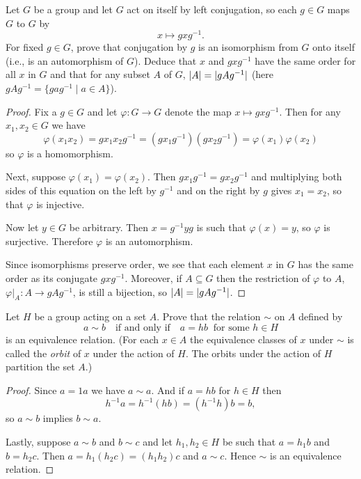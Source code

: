  Let $G$ be a group and let $G$ act on itself by left
conjugation, so each $g\in G$ maps $G$ to $G$ by
\begin{equation*}
  x\mapsto gxg^{-1}.
\end{equation*}
For fixed $g\in G$, prove that conjugation by $g$ is an isomorphism
from $G$ onto itself (i.e., is an automorphism of $G$). Deduce that
$x$ and $gxg^{-1}$ have the same order for all $x$ in $G$ and that for
any subset $A$ of $G$, $\lvert{A}\rvert = \lvert{gAg^{-1}}\rvert$ (here
$gAg^{-1} = \{gag^{-1}\mid a\in A\}$).
\label{exercise-conjugation-is-automorphism}
\begin{proof}
  Fix a $g\in G$ and let $\varphi\colon G\to G$ denote the map
  $x\mapsto gxg^{-1}$. Then for any $x_1,x_2\in G$ we have
  \begin{equation*}
    \varphi(x_1x_2) = gx_1x_2g^{-1}
    = (gx_1g^{-1})(gx_2g^{-1}) = \varphi(x_1)\varphi(x_2)
  \end{equation*}
  so $\varphi$ is a homomorphism.

  Next, suppose $\varphi(x_1) = \varphi(x_2)$. Then
  $gx_1g^{-1} = gx_2g^{-1}$ and multiplying both sides of this
  equation on the left by $g^{-1}$ and on the right by $g$ gives
  $x_1 = x_2$, so that $\varphi$ is injective.

  Now let $y\in G$ be arbitrary. Then $x = g^{-1}yg$ is such that
  $\varphi(x) = y$, so $\varphi$ is surjective. Therefore $\varphi$ is
  an automorphism.

  Since isomorphisms preserve order, we see that each element $x$ in
  $G$ has the same order as its conjugate $gxg^{-1}$. Moreover, if
  $A\subseteq G$ then the restriction of $\varphi$ to $A$,
  $\varphi|_A\colon A\to gAg^{-1}$, is still a bijection, so
  $\lvert{A}\rvert = \lvert{gAg^{-1}}\rvert$.
\end{proof}

 Let $H$ be a group acting on a set $A$. Prove that the
relation $\sim$ on $A$ defined by
\begin{equation*}
  a\sim b
  \quad\text{if and only if}\quad
  a = hb\;\;\text{for some $h\in H$}
\end{equation*}
is an equivalence relation. (For each $x\in A$ the equivalence classes
of $x$ under $\sim$ is called the {\em orbit} of $x$ under the action
of $H$. The orbits under the action of $H$ partition the set $A$.)
\begin{proof}
  Since $a = 1a$ we have $a\sim a$. And if $a = hb$ for $h\in H$ then
  \begin{equation*}
    h^{-1}a = h^{-1}(hb) = (h^{-1}h)b = b,
  \end{equation*}
  so $a\sim b$ implies $b\sim a$.

  Lastly, suppose $a\sim b$ and $b\sim c$ and let $h_1,h_2\in H$ be
  such that $a = h_1b$ and $b = h_2c$. Then
  $a = h_1(h_2c) = (h_1h_2)c$ and $a\sim c$. Hence $\sim$ is an
  equivalence relation.
\end{proof}

